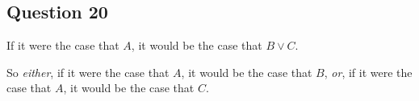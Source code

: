 \subsection*{Question 20}
\begin{enumerate*}
\item If it were the case that $A$, it would be the case that $B \vee C$.
\item So \textit{either}, if it were the case that $A$, it would be the case that $B$, \textit{or}, if it were the case that $A$, it would be the case that $C$.
\end{enumerate*}



